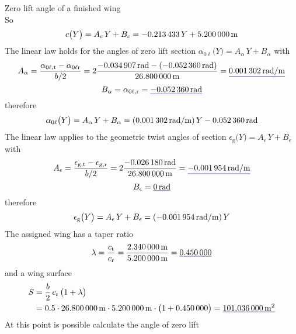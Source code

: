 \documentclass[[12pt,twoside]{book}
\begin{document}
\begin{myExampleX}{Zero lift angle of a finished wing}{}
\[\]
So
\[
c \big( Y \big) = A_c \, Y + B_c
  = \SI[round-precision=3]{\myCoeffAChordWing}{} \, Y
    + \SI[round-precision=2]{\myCoeffBChordWingMT}{\metre}
\]
The linear law holds for the angles of zero lift section $\alpha_{0\ell} \big( Y \big) = A_{\alpha} \, Y + B_{\alpha}$ 
with
\[
A_{\alpha}
  = \frac{\alpha_{0\ell,\mathrm{t}} - \alpha_{0\ell\mathrm{r}}}{b/2}
  = 
    2 \frac{
      \SI[round-precision=4]{\myAlphaZeroLiftTipWingRAD}{\radian} 
        - ( \SI[round-precision=4]{\myAlphaZeroLiftRootWingRAD}{\radian} )
    }{
      \SI[round-precision=2]{\mySpanWingMT}{\metre}
    }
  = \mathunderline{mydarkblue}{ \SI[round-precision=5]{\myCoeffAAeroTwistWingRADMT}{\radian/\metre} }
\]
\[
B_{\alpha}
  = \alpha_{0\ell,\mathrm{r}}
  = \mathunderline{mydarkblue}{ \SI[round-precision=4]{\myAlphaZeroLiftRootWingRAD}{\radian} }
\]
therefore
\[
\alpha_{0\ell} \big( Y \big) = A_{\alpha} \, Y + B_{\alpha}
  = (\SI[round-precision=5]{\myCoeffAAeroTwistWingRADMT}{\radian/\metre}) \, Y
    \SI[round-precision=4]{\myAlphaZeroLiftRootWingRAD}{\radian}
\]
The linear law applies to the geometric twist angles of section
$\epsilon_\mathrm{g} \big( Y \big) = A_{\epsilon} \, Y + B_{\epsilon}$ 
with
\[
A_{\epsilon}
  = \frac{\epsilon_{\mathrm{g,t}} - \epsilon_{\mathrm{g,r}}}{b/2}
  = 
    2 \frac{
      \SI[round-precision=4]{\myTwistWingRAD}{\radian} 
    }{
      \SI[round-precision=2]{\mySpanWingMT}{\metre}
    }
  = \mathunderline{mydarkblue}{ \SI[round-precision=5]{\myCoeffATwistWingRADMT}{\radian/\metre} }
\]
\[
B_{\epsilon}
  = \mathunderline{mydarkblue}{ \SI[round-precision=0]{0}{\radian} }
\]
therefore
\[
\epsilon_\mathrm{g} \big( Y \big) = A_{\epsilon} \, Y + B_{\epsilon}
  = (\SI[round-precision=5]{\myCoeffATwistWingRADMT}{\radian/\metre}) \, Y
\]
The assigned wing has a taper ratio
\[
\lambda
  =\frac{c_\mathrm{t}}{c_\mathrm{r}}
  =\frac{\SI[round-precision=2]{\myChordTipWingMT}{\metre}}{\SI[round-precision=2]{\myChordRootWingMT}{\metre}}
  =\mathunderline{mydarkblue}{ \SI[round-precision=2]{\myTaperRatioWing}{} }
\]
and a wing surface
\[
\begin{split}
S & {}= \frac{b}{2} \, c_\mathrm{r} \, \big( 1 + \lambda \big) \\
  & {}=
    \num{0.5} \cdot \SI[round-precision=1]{\mySpanWingMT}{\metre}
      \cdot \SI[round-precision=2]{\myChordRootWingMT}{\metre}
      \cdot \big( 1 + \SI[round-precision=2]{\myTaperRatioWing}{} \big) 
    = \mathunderline{mydarkblue}{ \SI[round-precision=1]{\myAreaWingMTsquared}{\metre^2} }
\end{split}
\]
At this point is possible calculate the angle of zero lift

\end{myExampleX}
\end{document}
